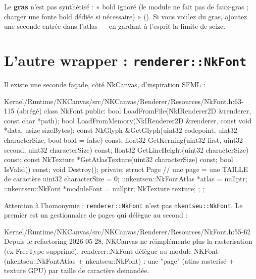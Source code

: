 Le \textbf{gras} n'est pas synthétisé : « bold ignoré (le module ne fait pas de
faux-gras ; charger une fonte bold dédiée si nécessaire) »
(). Si vous voulez du gras, ajoutez une
seconde entrée dans l'atlas — en gardant à l'esprit la limite de seize.

\section{L'autre wrapper : \texttt{renderer::NkFont}}

Il existe une seconde façade, côté NkCanvas, d'inspiration SFML :

\begin{nkcode}{Kernel/Runtime/NKCanvas/src/NKCanvas/Renderer/Resources/NkFont.h:63-115 (abrégé)}
        class NkFont {
            public:
                bool LoadFromFile(NkIRenderer2D &renderer, const char *path);
                bool LoadFromMemory(NkIRenderer2D &renderer, const void *data, usize sizeBytes);
                const NkGlyph &GetGlyph(uint32 codepoint, uint32 characterSize, bool bold = false) const;
                float32 GetKerning(uint32 first, uint32 second, uint32 characterSize) const;
                float32 GetLineHeight(uint32 characterSize) const;
                const NkTexture *GetAtlasTexture(uint32 characterSize) const;
                bool IsValid() const;
                void Destroy();
            private:
                struct Page {                       // une page = une TAILLE de caractère
                        uint32 characterSize = 0;
                        ::nkentseu::NkFontAtlas *atlas = nullptr;
                        ::nkentseu::NkFont *moduleFont = nullptr;
                        NkTexture texture;
                };
        };
\end{nkcode}

Attention à l'homonymie : \texttt{renderer::NkFont} n'est pas
\texttt{nkentseu::NkFont}. Le premier est un gestionnaire de pages qui délègue au
second :

\begin{nkcode}{Kernel/Runtime/NKCanvas/src/NKCanvas/Renderer/Resources/NkFont.h:55-62}
 Depuis le refactoring 2026-05-28, NKCanvas ne réimplémente plus la
 rasterisation (ex-FreeType supprimé). renderer::NkFont délègue au module
 NKFont (nkentseu::NkFontAtlas + nkentseu::NkFont) : une "page" (atlas
 rasterisé + texture GPU) par taille de caractère demandée.
\end{nkcode}

